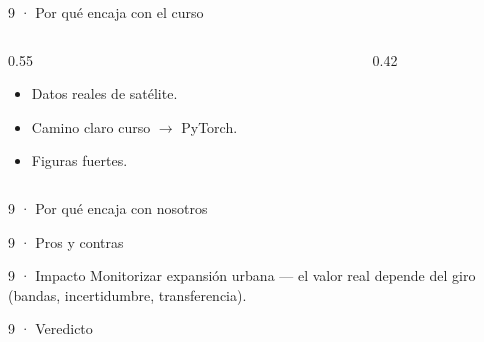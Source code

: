 \begin{frame}{9 · Por qué encaja con el curso}
  \begin{columns}[T]
    \begin{column}{0.55\textwidth}
      \begin{itemize}
        \item Datos reales de satélite.
        \item Camino claro curso $\rightarrow$ PyTorch.
        \item Figuras fuertes.
      \end{itemize}
    \end{column}
    \begin{column}{0.42\textwidth}
    \end{column}
  \end{columns}
\end{frame}

\begin{frame}{9 · Por qué encaja con nosotros}
\end{frame}

\begin{frame}{9 · Pros y contras}
\end{frame}

\begin{frame}{9 · Impacto}
  Monitorizar expansión urbana --- el valor real depende del giro (bandas, incertidumbre, transferencia).
\end{frame}

\begin{frame}{9 · Veredicto}
\end{frame}
